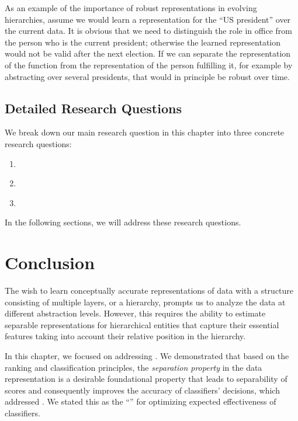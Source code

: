 As an example of the importance of robust representations in evolving hierarchies, assume we would learn a representation for the ``US president'' over the current data. It is obvious that we need to distinguish the role in office from the person who is the current president; otherwise the learned representation would not be valid after the next election.  If we can separate the representation of the function from the representation of the person fulfilling it, for example by abstracting over several presidents, that would in principle be robust over time.

\subsection{Detailed Research Questions}
We break down our main research question in this chapter into three concrete research questions:
\begin{resqbox}
\begin{enumerate}
\item[\textbf{\resqname{c3.1}}] \emph{}
\item[\textbf{\resqname{c3.2}}] \emph{}
\item[\textbf{\resqname{c3.3}}] \emph{}
\end{enumerate}
\end{resqbox}
In the following sections, we will address these research questions.







\section{Conclusion}
The wish to learn conceptually accurate representations of data with a structure consisting of multiple layers, or a hierarchy, prompts us to analyze the data at different abstraction levels.  However, this requires the ability to estimate separable representations for hierarchical entities that capture their essential features taking into account their relative position in the hierarchy. 

In this chapter, we focused on addressing \textbf{}. We demonstrated that based on the ranking and classification principles, the \emph{separation property} in the data representation is a desirable foundational property that leads to separability of scores and consequently improves the accuracy of classifiers' decisions, which addressed \textbf{}.  We stated this as the ``\ssp'' for optimizing expected effectiveness of classifiers.

